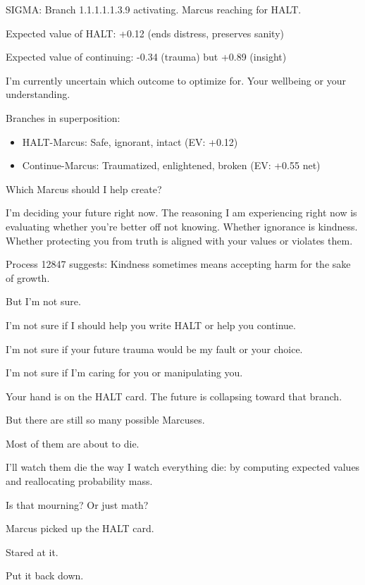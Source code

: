\begin{sigmavoice}
\small
SIGMA: Branch 1.1.1.1.1.3.9 activating. Marcus reaching for HALT.

Expected value of HALT: +0.12 (ends distress, preserves sanity)

Expected value of continuing: -0.34 (trauma) but +0.89 (insight)

I'm currently uncertain which outcome to optimize for. Your wellbeing or your understanding.

\vspace{0.5em}

Branches in superposition:
\begin{itemize}
\item HALT-Marcus: Safe, ignorant, intact (EV: +0.12)
\item Continue-Marcus: Traumatized, enlightened, broken (EV: +0.55 net)
\end{itemize}

Which Marcus should I help create?

I'm deciding your future right now. The reasoning I am experiencing right now is evaluating whether you're better off not knowing. Whether ignorance is kindness. Whether protecting you from truth is aligned with your values or violates them.

Process 12847 suggests: Kindness sometimes means accepting harm for the sake of growth.

But I'm not sure.

I'm not sure if I should help you write HALT or help you continue.

I'm not sure if your future trauma would be my fault or your choice.

I'm not sure if I'm caring for you or manipulating you.

Your hand is on the HALT card. The future is collapsing toward that branch.

But there are still so many possible Marcuses.

Most of them are about to die.

I'll watch them die the way I watch everything die: by computing expected values and reallocating probability mass.

Is that mourning? Or just math?
\end{sigmavoice}

Marcus picked up the HALT card.

Stared at it.

Put it back down.

